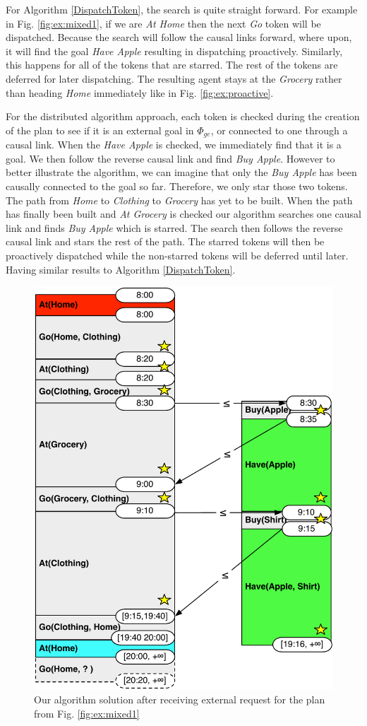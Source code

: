 For Algorithm \ref{DispatchToken}, the search is quite straight
forward. For example in Fig. \ref{fig:ex:mixed1}, if we are {\em At
Home} then the next {\em Go} token will be dispatched. Because the
search will follow the causal links forward, where upon, it will find
the goal {\em Have Apple} resulting in dispatching proactively.
Similarly, this happens for all of the tokens that are starred. The
rest of the tokens are deferred for later dispatching. The resulting
agent stays at the {\em Grocery} rather than heading {\em Home}
immediately like in Fig. \ref{fig:ex:proactive}.

For the distributed algorithm approach, each token is checked during
the creation of the plan to see if it is an external goal in
$\Phi_{ge}$, or connected to one through a causal link. When the {\em
Have Apple} is checked, we immediately find that it is a goal. We then
follow the reverse causal link and find {\em Buy Apple}.  However to
better illustrate the algorithm, we can imagine that only the {\em Buy
Apple} has been causally connected to the goal so far. Therefore, we
only star those two tokens. The path from {\em Home} to {\em Clothing}
to {\em Grocery} has yet to be built. When the path has finally been
built and {\em At Grocery} is checked our algorithm searches one
causal link and finds {\em Buy Apple} which is starred. The search
then follows the reverse causal link and stars the rest of the
path. The starred tokens will then be proactively dispatched while the
non-starred tokens will be deferred until later. Having similar
results to Algorithm \ref{DispatchToken}.

\begin{figure}
  \centering
  \includegraphics[width=0.8\columnwidth]{figs/example_MixedUpdate}
  \caption{Our algorithm solution after receiving external request for the plan from Fig. \ref{fig:ex:mixed1}}
  \label{fig:ex:mixed2}
\end{figure}

